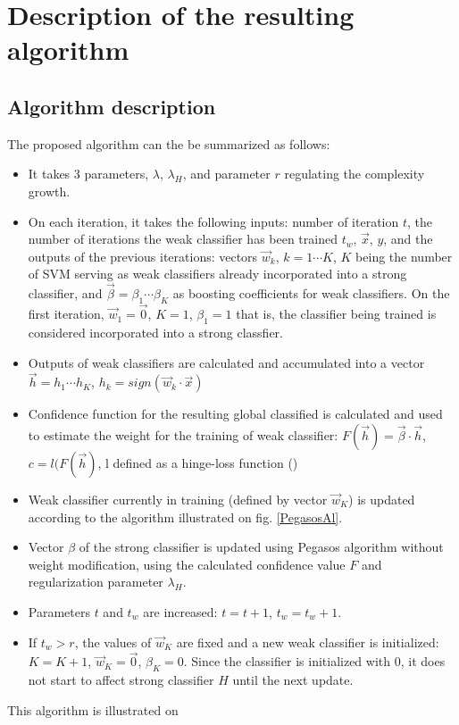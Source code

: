 \section{Description of the resulting algorithm}
\subsection {Algorithm description}
The proposed algorithm  can the be summarized as follows: 
\begin{itemize}
\item It takes 3 parameters, $\lambda$, $\lambda_H$, and parameter $r$ regulating the complexity growth.
\item On each iteration, it takes the following inputs: number of iteration $t$, the number of iterations the weak classifier has been trained $t_w$, $\vec{x}$, $y$, and the outputs of the previous iterations: vectors $\vec{w}_k$, $k=1\cdots K$, $K$ being the number of SVM serving as weak classifiers already incorporated into a strong classifier, and $\vec{\beta}=\beta_1 \cdots\beta_K$ as boosting coefficients for weak classifiers.  On the first iteration, $\vec{w}_1=\vec{0}$, $K=1$, $\beta_1=1$ that is, the classifier being trained is considered incorporated into a strong classfier. 
\item Outputs of weak classifiers are calculated and accumulated into a vector $\vec{h}=h_1\cdots h_K$, $h_k=sign(\vec{w}_k\cdot \vec{x})$ 
\item Confidence function for the resulting global classified is calculated and used to estimate the weight for the training of weak classifier: $F(\vec{h})=\vec{\beta}\cdot \vec{h}$, $c=l(F(\vec{h})$, l defined as a hinge-loss function ()
\item Weak classifier currently in training (defined by vector $\vec{w}_K$) is updated according to the algorithm illustrated on fig. \ref{PegasosAl}.
\item Vector $\beta$ of the strong classifier is updated using Pegasos algorithm without weight modification, using the calculated confidence value $F$ and regularization parameter $\lambda_H$.
\item Parameters $t$ and $t_w$ are increased: $t=t+1$, $t_w=t_w+1$. 
\item If $t_w>r$, the values of $\vec{w}_K$ are fixed and a new weak classifier is initialized: $K=K+1$, $\vec{w}_K=\vec{0}$,  $\beta_K=0$. Since the classifier is initialized with $0$, it does not start to affect strong classifier $H$ until the next update.
\end{itemize}
This algorithm is illustrated on 

